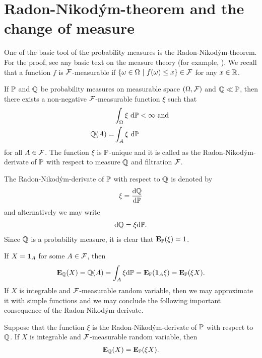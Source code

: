 \section{Radon-Nikod\'{y}m-theorem and the change of measure}
\label{sec:radonnikodymtheorem}

One of the basic tool of the probability measures is the Radon-Nikod\'{y}m-theorem. For the proof, see any basic text on the measure theory (for example, \textcite[pp. 449-450]{billingsley2012probabilityandmeasure}). We recall that a function $f$ is $\mathcal{F}$-measurable if $\{ \omega \in \Omega \ | \ f(\omega) \leq x \} \in \mathcal{F}$ for any $x \in \mathbb{R}$.

\begin{thm}
	If $\mathbb{P}$ and $\mathbb{Q}$ be probability measures on measurable space $(\Omega, \mathcal{F})$ and $\mathbb{Q} \ll \mathbb{P}$, then there exists a non-negative $\mathcal{F}$-measurable function $\xi$ such that
	\begin{align}
	&\int_{\Omega} \xi \ \mathrm{d} \mathbb{P} < \infty \text{ and } \\
	\mathbb{Q} (A) = &\int_A \xi \ \mathrm{d} \mathbb{P}
	\end{align}
	for all $A \in \mathcal{F}$. The function $\xi$ is $\mathbb{P}$-unique and it is called as the Radon-Nikod\'{y}m-derivate of $\mathbb{P}$ with respect to measure $\mathbb{Q}$ and filtration $\mathcal{F}$.
\end{thm}

The Radon-Nikod\'{y}m-derivate of $\mathbb{P}$ with respect to $\mathbb{Q}$ is denoted by
\begin{align}
\xi = \frac{\mathrm{d} \mathbb{Q}}{\mathrm{d} \mathbb{P}}
\end{align}
and alternatively we may write
\begin{align}
\mathrm{d} \mathbb{Q} = \xi \mathrm{d} \mathbb{P} .
\end{align}
Since $\mathbb{Q}$ is a probability measure, it is clear that $\operatorname{\boldsymbol{\mathrm{E}}}_{\mathbb{P}} (\xi) = 1$. 

If $X = \boldsymbol{1}_A$ for some $A \in \mathcal{F}$, then
\begin{align}
\operatorname{\boldsymbol{\mathrm{E}}}_{\mathbb{Q}} (X) = \mathbb{Q} (A) = \int_A \xi \mathrm{d} \mathbb{P} = \operatorname{\boldsymbol{\mathrm{E}}}_{\mathbb{P}} ( \boldsymbol{1}_A \xi ) = \operatorname{\boldsymbol{\mathrm{E}}}_{\mathbb{P}} (\xi X) .
\end{align}
If $X$ is integrable and $\mathcal{F}$-measurable random variable, then we may approximate it with simple functions and we may conclude the following important consequence of the Radon-Nikod\'{y}m-derivate.

\begin{lemma}
	\label{radonnikodymconsequence}
	Suppose that the function $\xi$ is the Radon-Nikod\'{y}m-derivate of $\mathbb{P}$ with respect to $\mathbb{Q}$. If $X$ is integrable and $\mathcal{F}$-measurable random variable, then
	\begin{align}
	\operatorname{\boldsymbol{\mathrm{E}}}_{\mathbb{Q}} (X) = \operatorname{\boldsymbol{\mathrm{E}}}_{\mathbb{P}} ( \xi X).
	\end{align}
\end{lemma}

